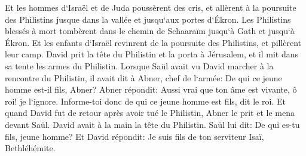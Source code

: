 \verse Et les hommes d`Israël et de Juda poussèrent des cris, et allèrent à la poursuite des Philistins jusque dans la vallée et jusqu`aux portes d`Ékron. Les Philistins blessés à mort tombèrent dans le chemin de Schaaraïm jusqu`à Gath et jusqu`à Ékron. 
\verse Et les enfants d`Israël revinrent de la poursuite des Philistins, et pillèrent leur camp. 
\verse David prit la tête du Philistin et la porta à Jérusalem, et il mit dans sa tente les armes du Philistin. 
\verse Lorsque Saül avait vu David marcher à la rencontre du Philistin, il avait dit à Abner, chef de l`armée: De qui ce jeune homme est-il fils, Abner? Abner répondit: Aussi vrai que ton âme est vivante, ô roi! je l`ignore. 
\verse Informe-toi donc de qui ce jeune homme est fils, dit le roi. 
\verse Et quand David fut de retour après avoir tué le Philistin, Abner le prit et le mena devant Saül. David avait à la main la tête du Philistin. 
\verse Saül lui dit: De qui es-tu fils, jeune homme? Et David répondit: Je suis fils de ton serviteur Isaï, Bethléhémite. 

\chapter{}

